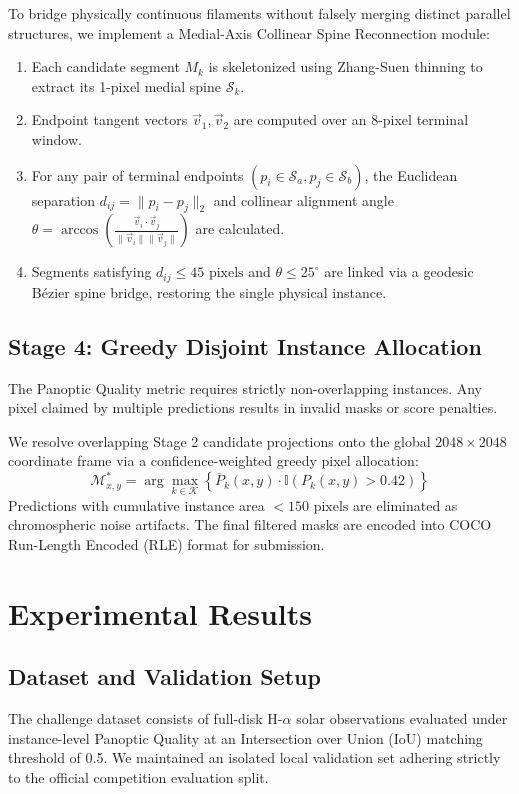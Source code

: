 \documentclass[conference]{IEEEtran}
\begin{document}
To bridge physically continuous filaments without falsely merging distinct parallel structures, we implement a Medial-Axis Collinear Spine Reconnection module:
\begin{enumerate}
    \item Each candidate segment $M_k$ is skeletonized using Zhang-Suen thinning to extract its 1-pixel medial spine $\mathcal{S}_k$.
    \item Endpoint tangent vectors $\vec{v}_1, \vec{v}_2$ are computed over an 8-pixel terminal window.
    \item For any pair of terminal endpoints $(p_i \in \mathcal{S}_a, p_j \in \mathcal{S}_b)$, the Euclidean separation $d_{ij} = \|p_i - p_j\|_2$ and collinear alignment angle $\theta = \arccos(\frac{\vec{v}_i \cdot \vec{v}_j}{\|\vec{v}_i\|\|\vec{v}_j\|})$ are calculated.
    \item Segments satisfying $d_{ij} \le 45\text{ pixels}$ and $\theta \le 25^\circ$ are linked via a geodesic Bézier spine bridge, restoring the single physical instance.
\end{enumerate}

\subsection{Stage 4: Greedy Disjoint Instance Allocation}
The Panoptic Quality metric requires strictly non-overlapping instances. Any pixel claimed by multiple predictions results in invalid masks or score penalties. 

We resolve overlapping Stage 2 candidate projections onto the global $2048\times2048$ coordinate frame via a confidence-weighted greedy pixel allocation:
\begin{equation}
\mathcal{M}^*_{x, y} = \arg\max_{k \in \mathcal{K}} \left\{ \bar{P}_k(x, y) \cdot \mathbb{I}(P_k(x, y) > 0.42) \right\}
\end{equation}
Predictions with cumulative instance area $< 150\text{ pixels}$ are eliminated as chromospheric noise artifacts. The final filtered masks are encoded into COCO Run-Length Encoded (RLE) format for submission.

\section{Experimental Results}

\subsection{Dataset and Validation Setup}
The challenge dataset consists of full-disk H-$\alpha$ solar observations evaluated under instance-level Panoptic Quality at an Intersection over Union (IoU) matching threshold of 0.5. We maintained an isolated local validation set adhering strictly to the official competition evaluation split.
\end{document}
